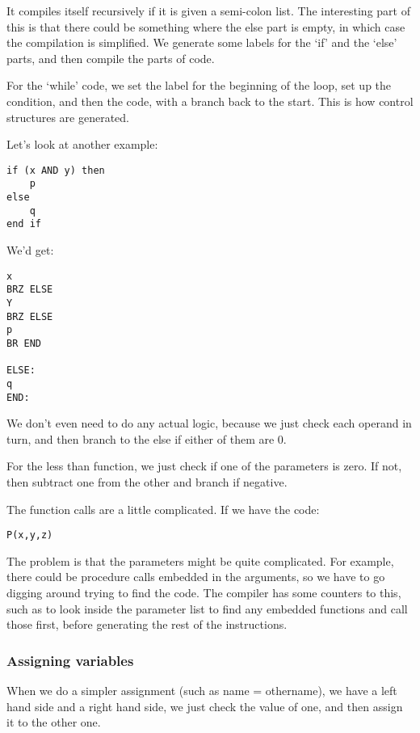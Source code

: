 \documentclass[11pt,a4paper,titlepage,dvipsnames,cmyk]{scrartcl}
\begin{document}
It compiles itself recursively if it is given a semi-colon list. The
interesting part of this is that there could be something where the else
part is empty, in which case the compilation is simplified. We generate
some labels for the `if' and the `else' parts, and then compile the parts
of code.

For the `while' code, we set the label for the beginning of the loop, set
up the condition, and then the code, with a branch back to the start. This
is how control structures are generated.

Let's look at another example:

\begin{lstlisting}[style=b]
if (x AND y) then
    p
else
    q
end if
\end{lstlisting}

We'd get:
\begin{lstlisting}[style=B]
x
BRZ ELSE
Y
BRZ ELSE
p
BR END

ELSE:
q
END:
\end{lstlisting}

We don't even need to do any actual logic, because we just check each
operand in turn, and then branch to the else if either of them are 0.

For the less than function, we just check if one of the parameters is
zero. If not, then subtract one from the other and branch if negative.

The function calls are a little complicated. If we have the code:

\begin{lstlisting}[style=B]
P(x,y,z)
\end{lstlisting}

The problem is that the parameters might be quite complicated. For
example, there could be procedure calls embedded in the arguments, so we
have to go digging around trying to find the code. The compiler has some
counters to this, such as to look inside the parameter list to find any
embedded functions and call those first, before generating the rest of the
instructions.

\subsubsection{Assigning variables}%
\label{ssub:Assigning variables}

When we do a simpler assignment (such as name = othername), we have a left
hand side and a right hand side, we just check the value of one, and then
assign it to the other one.
\end{document}
